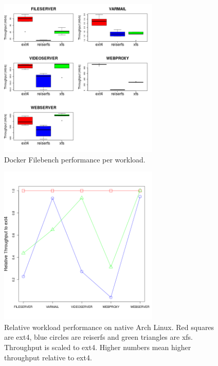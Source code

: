 \documentclass[letterpaper,twocolumn,10pt]{article}
\begin{document}
\begin{figure}[!ht]
\centering
\includegraphics[width=3in]{../results/dock_workload_boxplots.png}
\caption{Docker Filebench performance per workload.}
\label{fig:dock_workload_boxplots}
\end{figure}

\begin{figure}[!ht]
\centering
\includegraphics[width=3in]{../results/arch_relative_performance.png}
\caption{Relative workload performance on native Arch Linux. Red squares are ext4, blue circles are reiserfs and green triangles are xfs. Throughput is scaled to ext4. Higher numbers mean higher throughput relative to ext4.}
\label{fig:arch_relative_performance}
\end{figure}
\end{document}
